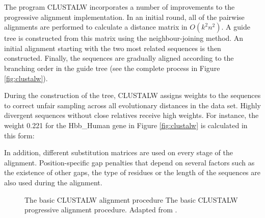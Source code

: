 The program CLUSTALW \citep{thompson:1994a} 
 
incorporates a number of improvements
to the progressive alignment implementation. In an initial round, all of the pairwise 
alignments are performed to calculate a distance matrix in $O(k^2 n^2)$.
A guide tree is constructed from this matrix using the neighbour-joining 
method. An initial alignment starting with the two most related sequences is then
constructed. Finally, the sequences are gradually aligned according to the branching 
order in the guide tree (see the complete process in Figure \ref{fig:clustalw}).

During the construction of the tree, CLUSTALW assigns weights to the sequences to 
correct unfair sampling across all evolutionary distances in the data set. Highly 
divergent sequences without close relatives receive high weights. For instance,
the weight 0.221 for the Hbb\_Human gene in Figure \ref{fig:clustalw} is calculated 
in this form:

\begin{center}
\end{center}

In addition, different substitution matrices are used on every stage of the alignment.
Position-specific gap penalties that depend on several factors such as the existence 
of other gaps, the type of residues or the length of the sequences are also used during 
the alignment.

\begin{figure}[t!]
\begin{center}
\setlength{\fboxsep}{0pt}
          {The basic CLUSTALW alignment procedure}%
          {The basic CLUSTALW progressive alignment procedure.}%
          {Adapted from \citet{thompson:1994a}.}
\end{center}
\end{figure}


